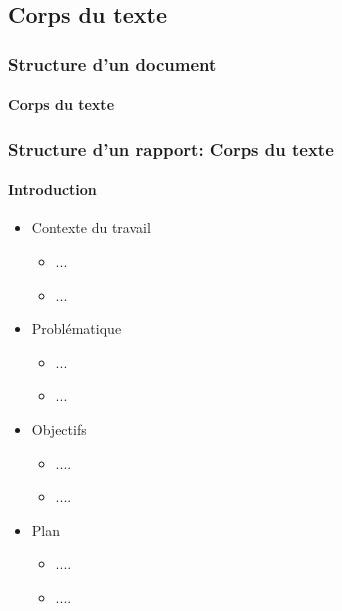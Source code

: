 \documentclass[xcolor=table]{beamer}
\begin{document}
\subsection{Corps du texte}

\begin{frame}
\frametitle{Structure d'un document}
\framesubtitle{Corps du texte}

\end{frame}

\begin{frame}
\frametitle{Structure d'un rapport: Corps du texte}
\framesubtitle{Introduction}

\begin{itemize}
	\item Contexte du travail 
	\begin{itemize}
		\item ...
		\item ...
	\end{itemize}

	\item Problématique 
	\begin{itemize}
		\item ...
		\item ...
	\end{itemize}

	\item Objectifs 
	\begin{itemize}
		\item ....
		\item ....
	\end{itemize}

	\item Plan 
	\begin{itemize}
		\item ....
		\item ....
	\end{itemize}

\end{itemize}

\end{frame}
\end{document}

